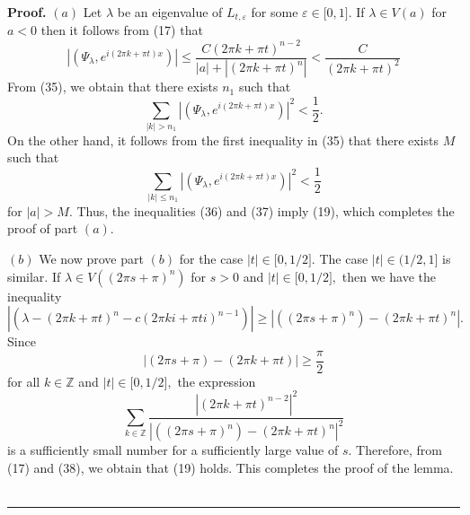 \documentclass{article}%
\newenvironment{proof}[1][Proof]{\textbf{#1.} }{\ \rule{0.5em}{0.5em}}
\begin{document}
\begin{proof}
$(a)$ Let $\lambda$ be an eigenvalue of $L_{t,\varepsilon}$ for some
$\varepsilon\in\lbrack0,1].$ If $\lambda\in V(a)$ for $a<0$ then it follows
from (17) that
\begin{equation}
\left\vert \left(  \Psi_{\lambda},e^{i\left(  2\pi k+\pi t\right)  x}\right)
\right\vert \leq\frac{C(2\pi k+\pi t)^{n-2}}{\left\vert a\right\vert
+\left\vert \left(  2\pi k+\pi t\right)  ^{n}\right\vert }<\frac{C}{\left(
2\pi k+\pi t\right)  ^{2}} \tag{35}%
\end{equation}
From (35), we obtain that there exists $n_{1}$ such that \
\begin{equation}
\sum_{\left\vert k\right\vert >n_{1}}\left\vert \left(  \Psi_{\lambda
},e^{i\left(  2\pi k+\pi t\right)  x}\right)  \right\vert ^{2}<\frac{1}{2}.
\tag{36}%
\end{equation}
On the other hand, it follows from the first inequality in (35) that there
exists $M$ such that \
\begin{equation}
\sum_{\left\vert k\right\vert \leq n_{1}}\left\vert \left(  \Psi_{\lambda
},e^{i\left(  2\pi k+\pi t\right)  x}\right)  \right\vert ^{2}<\frac{1}{2}
\tag{37}%
\end{equation}
for $\left\vert a\right\vert >M$. Thus, the inequalities (36) and (37) imply
(19), which completes the proof of part $(a)$.

$(b)$ We now prove part $(b)$ for the case $\left\vert t\right\vert \in
\lbrack0,1/2].$ The case $\left\vert t\right\vert \in(1/2,1]$ is similar. If
$\lambda\in V(\left(  2\pi s+\pi\right)  ^{n})$ for $s>0$ and $\left\vert
t\right\vert \in\lbrack0,1/2],$ then we have the inequality
\begin{equation}
\left\vert \left(  \lambda-\left(  2\pi k+\pi t\right)  ^{n}-c(2\pi ki+\pi
ti)^{n-1}\right)  \right\vert \geq\left\vert (\left(  2\pi s+\pi\right)
^{n})-(2\pi k+\pi t)^{n}\right\vert . \tag{38}%
\end{equation}
Since
\[
\left\vert \left(  2\pi s+\pi\right)  -(2\pi k+\pi t)\right\vert \geq\frac
{\pi}{2}%
\]
for all $k\in\mathbb{Z}$ and $\left\vert t\right\vert \in\lbrack0,1/2],$ the
expression
\[
\sum_{k\in\mathbb{Z}}\frac{\left\vert \left(  2\pi k+\pi t\right)
^{n-2}\right\vert ^{2}}{\left\vert (\left(  2\pi s+\pi\right)  ^{n})-(2\pi
k+\pi t)^{n}\right\vert ^{2}}%
\]
is a sufficiently small number for a sufficiently large value of $s.$
Therefore, from (17) and (38), we obtain that (19) holds. This completes the
proof of the lemma.
\end{proof}
\end{document}
